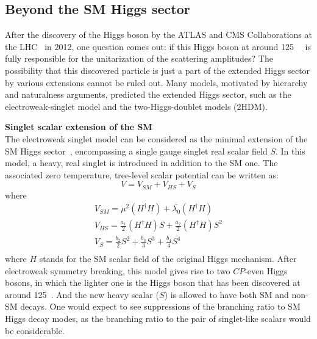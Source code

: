 \subsection{Beyond the SM Higgs sector}
\label{bsmhiggs}

After the discovery of the Higgs boson by the ATLAS and CMS Collaborations at the LHC~\cite{20121, 201230} in 2012,
one question comes out: if this Higgs boson at around 125~\gev~ is fully responsible for the unitarization of the scattering amplitudes?
The possibility that this discovered particle is just a part of the extended Higgs sector by various extensions cannot be ruled out.
Many models, motivated by hierarchy and naturalness arguments, 
predicted the extended Higgs sector, such as the electroweak-singlet model and the two-Higgs-doublet models (2HDM).

\textbf{Singlet scalar extension of the SM} \\
The electroweak singlet model can be considered as the minimal extension of the SM Higgs sector~\cite{Profumo_2007}, encompassing a single gauge singlet real scalar field $S$.
In this model, a heavy, real singlet is introduced in addition to the SM one.
The associated zero temperature, tree-level scalar potential can be written as:
\begin{equation}
    V = V_{SM} + V_{HS} + V_{S}
\end{equation}
where
\begin{equation}
\begin{split}
    V_{SM} =  \mu^{2} \left( H^{\dagger}H \right) + \bar{\lambda_{0}} \left( H^{\dagger}H \right) \\
    V_{HS} = \frac{a_{1}}{2}\left( H^{\dagger}H \right)S + \frac{a_{2}}{2}\left( H^{\dagger}H \right)S^{2} \\
    V_{S} = \frac{b_{2}}{2} S^{2} + \frac{b_{3}}{3} S^{3} + \frac{b_{4}}{4} S^{4} \\ 
\end{split}
\end{equation}
where $H$ stands for the SM scalar field of the original Higgs mechanism.
After electroweak symmetry breaking, this model gives rise to two $CP$-even Higgs bosons, in which the lighter one is the Higgs boson that has been discovered at around 125~\gev.
And the new heavy scalar ($S$) is allowed to have both SM and non-SM decays.
One would expect to see suppressions of the branching ratio to SM Higgs decay modes, as the branching ratio to the pair of singlet-like scalars would be considerable. 

